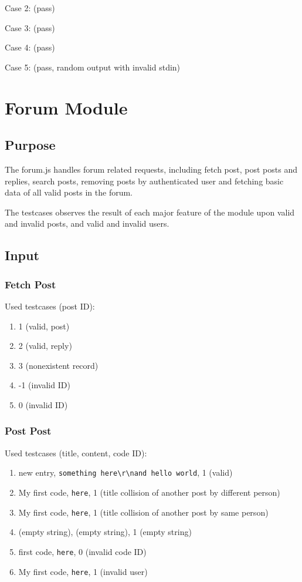 Case 2: (pass)


Case 3: (pass)


Case 4: (pass)


Case 5: (pass, random output with invalid stdin)


\section{Forum Module}
\subsection{Purpose}
The forum.js handles forum related requests, including fetch post, post posts and replies, search posts, removing posts by authenticated user and fetching basic data of all valid posts in the forum.

The testcases observes the result of each major feature of the module upon valid and invalid posts, and valid and invalid users.

\subsection{Input}
\subsubsection{Fetch Post}
Used testcases (post ID):
\begin{enumerate}
  \item 1 (valid, post)
  \item 2 (valid, reply)
  \item 3 (nonexistent record)
  \item -1 (invalid ID)
  \item 0 (invalid ID)
\end{enumerate}

\subsubsection{Post Post}
Used testcases (title, content, code ID):
\begin{enumerate}
  \item new entry, \verb|something here\r\nand hello world|, 1 (valid)
  \item My first code, \verb|here|, 1 (title collision of another post by different person)
  \item My first code, \verb|here|, 1 (title collision of another post by same person)
  \item (empty string), (empty string), 1 (empty string)
  \item first code, \verb|here|, 0 (invalid code ID)
  \item My first code, \verb|here|, 1 (invalid user)
\end{enumerate}

